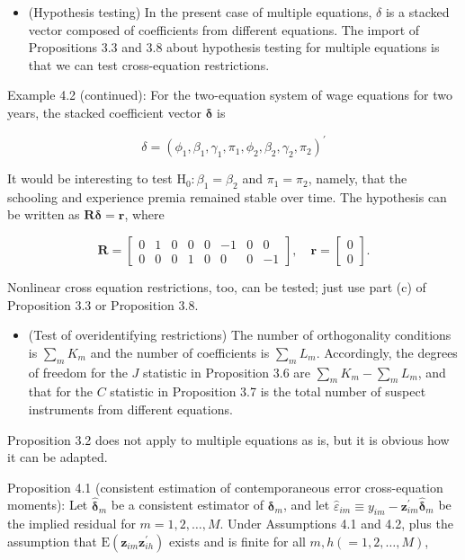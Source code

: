\documentclass[10pt]{article}
\begin{document}
\begin{itemize}
  \item (Hypothesis testing) In the present case of multiple equations, $\delta$ is a stacked vector composed of coefficients from different equations. The import of Propositions 3.3 and 3.8 about hypothesis testing for multiple equations is that we can test cross-equation restrictions.
\end{itemize}

Example 4.2 (continued): For the two-equation system of wage equations for two years, the stacked coefficient vector $\boldsymbol{\delta}$ is

$$
\delta=\left(\phi_{1}, \beta_{1}, \gamma_{1}, \pi_{1}, \phi_{2}, \beta_{2}, \gamma_{2}, \pi_{2}\right)^{\prime}
$$

It would be interesting to test $\mathrm{H}_{0}: \beta_{1}=\beta_{2}$ and $\pi_{1}=\pi_{2}$, namely, that the schooling and experience premia remained stable over time. The hypothesis can be written as $\mathbf{R} \boldsymbol{\delta}=\mathbf{r}$, where

$$
\mathbf{R}=\left[\begin{array}{cccccccc}
0 & 1 & 0 & 0 & 0 & -1 & 0 & 0 \\
0 & 0 & 0 & 1 & 0 & 0 & 0 & -1
\end{array}\right], \quad \mathbf{r}=\left[\begin{array}{l}
0 \\
0
\end{array}\right] .
$$

Nonlinear cross equation restrictions, too, can be tested; just use part (c) of Proposition 3.3 or Proposition 3.8.

\begin{itemize}
  \item (Test of overidentifying restrictions) The number of orthogonality conditions is $\sum_{m} K_{m}$ and the number of coefficients is $\sum_{m} L_{m}$. Accordingly, the degrees of freedom for the $J$ statistic in Proposition 3.6 are $\sum_{m} K_{m}-\sum_{m} L_{m}$, and that for the $C$ statistic in Proposition 3.7 is the total number of suspect instruments from different equations.
\end{itemize}

Proposition 3.2 does not apply to multiple equations as is, but it is obvious how it can be adapted.

Proposition 4.1 (consistent estimation of contemporaneous error cross-equation moments): Let $\hat{\boldsymbol{\delta}}_{m}$ be a consistent estimator of $\boldsymbol{\delta}_{m}$, and let $\hat{\varepsilon}_{i m} \equiv y_{i m}-\mathbf{z}_{i m}^{\prime} \hat{\boldsymbol{\delta}}_{m}$ be\\
the implied residual for $m=1,2, \ldots, M$. Under Assumptions 4.1 and 4.2, plus the assumption that $\mathrm{E}\left(\mathbf{z}_{i m} \mathbf{z}_{i h}^{\prime}\right)$ exists and is finite for all $m, h(=1,2, \ldots, M)$,
\end{document}
